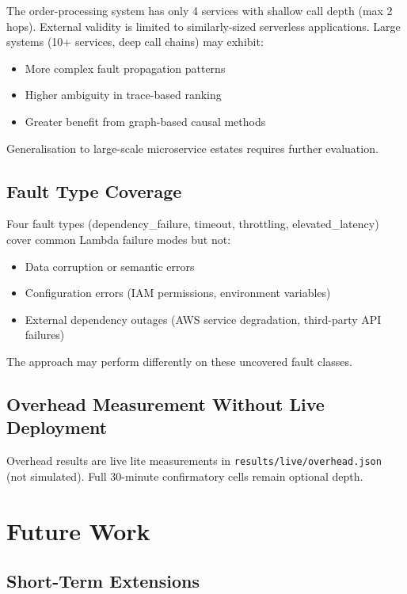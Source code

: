 The order-processing system has only 4 services with shallow call depth (max 2 hops). External validity is limited to similarly-sized serverless applications. Large systems (10+ services, deep call chains) may exhibit:
\begin{itemize}
    \item More complex fault propagation patterns
    \item Higher ambiguity in trace-based ranking
    \item Greater benefit from graph-based causal methods
\end{itemize}

Generalisation to large-scale microservice estates requires further evaluation.

\subsection{Fault Type Coverage}

Four fault types (dependency\_failure, timeout, throttling, elevated\_latency) cover common Lambda failure modes but not:
\begin{itemize}
    \item Data corruption or semantic errors
    \item Configuration errors (IAM permissions, environment variables)
    \item External dependency outages (AWS service degradation, third-party API failures)
\end{itemize}

The approach may perform differently on these uncovered fault classes.

\subsection{Overhead Measurement Without Live Deployment}

Overhead results are live lite measurements in \texttt{results/live/overhead.json} (not simulated). Full 30-minute confirmatory cells remain optional depth.

\section{Future Work}

\subsection{Short-Term Extensions}

